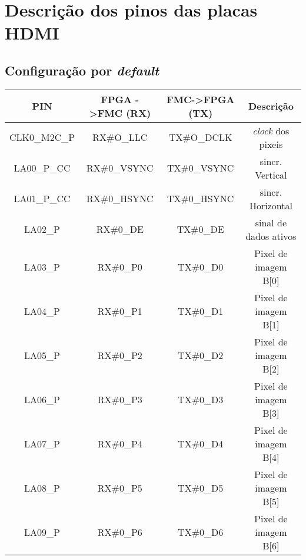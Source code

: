 \chapter{Descrição dos pinos das placas HDMI} \label{ap1:HDMI}

\section{Configuração por \textit{default}} \label{ap1:default}
\begin{longtable}[h!]
	{|c|c|c|c|}
	\hline
	\centering
%		
		\textbf{PIN} & \textbf{FPGA -\textgreater FMC (RX)} & \textbf{FMC->FPGA (TX)} & \textbf{Descrição}       \\ \hline \endhead
		CLK0\_M2C\_P & RX\#O\_LLC                           & TX\#O\_DCLK                        & \textit{clock} dos pixeis         \\ \hline
		LA00\_P\_CC  & RX\#0\_VSYNC                         & TX\#0\_VSYNC                       & sincr. Vertical          \\ \hline
		LA01\_P\_CC  & RX\#0\_HSYNC                         & TX\#0\_HSYNC                       & sincr. Horizontal        \\ \hline
		LA02\_P      & RX\#0\_DE                            & TX\#0\_DE                          & sinal de dados ativos    \\ \hline
		LA03\_P      & RX\#0\_P0                            & TX\#0\_D0                          & Pixel de imagem B{[}0{]} \\ \hline
		LA04\_P      & RX\#0\_P1                            & TX\#0\_D1                          & Pixel de imagem B{[}1{]} \\ \hline
		LA05\_P      & RX\#0\_P2                            & TX\#0\_D2                          & Pixel de imagem B{[}2{]} \\ \hline
		LA06\_P      & RX\#0\_P3                            & TX\#0\_D3                          & Pixel de imagem B{[}3{]} \\ \hline
		LA07\_P      & RX\#0\_P4                            & TX\#0\_D4                          & Pixel de imagem B{[}4{]} \\ \hline
		LA08\_P      & RX\#0\_P5                            & TX\#0\_D5                          & Pixel de imagem B{[}5{]} \\ \hline
		LA09\_P      & RX\#0\_P6                            & TX\#0\_D6                          & Pixel de imagem B{[}6{]} \\ \hline

\end{longtable}
